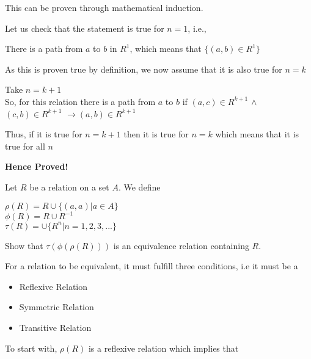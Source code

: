 \documentclass[addpoints]{exam}
\begin{document}
\begin{questions}
  \begin{solution}
    
    This can be proven through mathematical induction.
    
    Let us check that the statement is true for $n=1$, i.e.,
    
    There is a path from $a$ to $b$ in $R^1$, which means that
    $\{(a,b) \in R^1\}$
    
    As this is proven true by definition, we now assume that it is also true for $n = k$
    
    Take $n = k+1$
\\So, for this relation there is a path from $a$ to $b$ if $(a,c) \in R^{k+1} $ $\wedge$ $(c,b) \in R^{k+1} $ $\rightarrow (a,b) \in R^{k+1}$ 


Thus, if it is true for $n = k+1$ then it is true for $n= k$ which means that it is true for all $n$

\textbf{Hence Proved!}
    
    
  \end{solution}

\question
    Let $R$ be a relation on a set $A$. We define

    $\rho (R) = R \cup \{(a, a) | a \in A\}$ \\ 
    $\phi (R) = R \cup R^{-1}$ \\
    $\tau (R) = \cup \{ R^n | n = 1,2,3,...\}$
    
    Show that $\tau (\phi (\rho (R)))$ is an equivalence relation containing $R$.
    
      \begin{solution}
    
    For a relation to be equivalent, it must fulfill three conditions, i.e it must be a
    
    \begin{itemize}
    
    \item Reflexive Relation
    
    \item Symmetric Relation
    
    \item Transitive Relation
    
    
    
    
    \end{itemize}
    
    To start with, $\rho (R)$ is a reflexive relation which implies that
    

\end{solution}
\end{questions}
\end{document}
